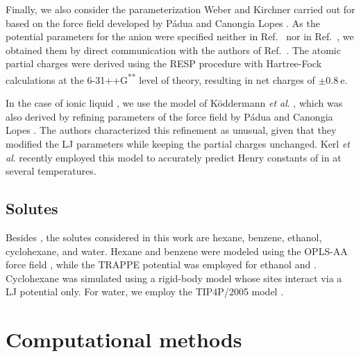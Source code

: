 \documentclass[3p,twocolumn]{elsarticle}
\begin{document}
Finally, we also consider the parameterization Weber and Kirchner \cite{Weber_2016} carried out for \ce{[emim][B(CN)_4]} based on the force field developed by P{\'{a}}dua and Canongia Lopes \cite{Canongia_Lopes_2006}.
As the potential parameters for the anion were specified neither in Ref.~ nor in Ref.~, we obtained them by direct communication with the authors of Ref.~.
The atomic partial charges were derived using the RESP procedure with Hartree-Fock calculations at the \mbox{6-31++G\textsuperscript{**}} level of theory, resulting in net charges of $\pm 0.8 ~\mathrm{e}$.

In the case of ionic liquid \ce{[emim][NTf_2]}, we use the model of K\"{o}ddermann \textit{et al}. \cite{Koddermann_2007}, which was also derived by refining parameters of the force field by P{\'{a}}dua and Canongia Lopes \cite{Canongia_Lopes_2006}.
The authors characterized this refinement as unusual, given that they modified the LJ parameters while keeping the partial charges unchanged.
Kerl \textit{et al}. \cite{Kerl__2017} recently employed this model to accurately predict Henry constants of  in \ce{[emim][NTf_2]} at several temperatures.

\subsection{Solutes}
\label{sec:force_field_sol}

Besides , the solutes considered in this work are hexane, benzene, ethanol, cyclohexane, and water.
Hexane and benzene were modeled using the OPLS-AA force field \cite{Jorgensen_1996}, while the TRAPPE potential \cite{Chen_2001,Potoff_2001} was employed for ethanol and .
Cyclohexane was simulated using a rigid-body model \cite{munoz2015lennard} whose sites interact via a LJ potential only.
For water, we employ the TIP4P/2005 model \cite{Abascal_2005,Vega_2011}.

\section{Computational methods}
\label{sec:sim_details}
\end{document}
